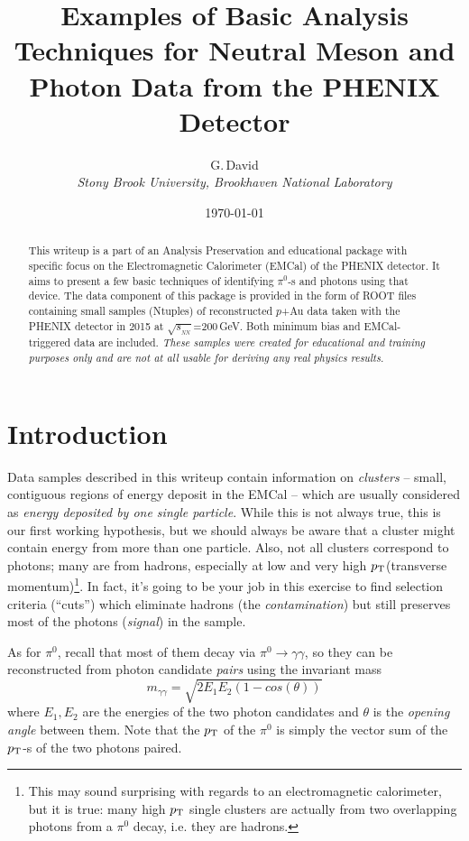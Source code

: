 \documentclass[pdftex,12pt,letter]{article}
\title{Examples of Basic Analysis Techniques for Neutral Meson and Photon
Data from the PHENIX Detector}
\date{\today}
\author{G.\,David\\
{ \it Stony Brook University, Brookhaven National Laboratory}}
\newcommand{\sqsn}{\mbox{$\sqrt{s_{_{NN}}}$}\xspace}
\newcommand{\piz}{\mbox{$\pi^0$}\xspace}
\newcommand{\pt}{\mbox{$p_{\rm T}$}\xspace}
\begin{document}
\maketitle

\begin{abstract}
\noindent  This writeup is a part of an Analysis Preservation and educational
 package with specific focus  on the Electromagnetic Calorimeter (EMCal)
of the PHENIX detector. It aims to present a few basic techniques
of identifying $\pi^0$-s and photons using that device.
The data component of this package is provided in the form of ROOT files
containing small samples (Ntuples) of reconstructed $p$+Au data taken with the PHENIX detector
in 2015 at \sqsn=200\,GeV.  Both minimum bias and EMCal-triggered data are included.
\textit{These samples were created for educational and training purposes only and are not at
all usable for deriving any real physics results.}
\end{abstract}


\section{Introduction}
Data samples described in this writeup contain
information on {\it clusters} -- small, contiguous regions of energy
deposit in the EMCal -- which are usually considered as 
{\it energy deposited by one single particle}.  While this is not
always true, this is our first working hypothesis, but we should
always be aware that a cluster might contain energy from more than one
particle.  Also, not all
clusters correspond to photons; many are from hadrons, especially at
low and very high \pt (transverse momentum)\footnote{
This may sound  surprising with regards to an electromagnetic calorimeter,
but it is true: many   high \pt single clusters are actually from two
overlapping photons  from a \piz decay, i.e. they are hadrons.}. 
In fact, it's going to be your job in this exercise to find selection criteria (``cuts'')
which eliminate hadrons (the {\it contamination}) but still preserves most of the
photons (\textit{signal}) in the sample.

As for \piz, recall that most of them decay via 
$\pi^0 \rightarrow \gamma\gamma$, so they can be reconstructed from
photon candidate {\it pairs} using the invariant mass
$$ m_{\gamma\gamma} = \sqrt{2E_1E_2(1-cos(\theta))} $$
where $E_1,E_2$ are the energies of the two photon candidates and
$\theta$ is the {\it opening angle} between them.  Note that the \pt
of the \piz is simply the vector sum of the \pt-s of the two photons
paired. 
\end{document}
